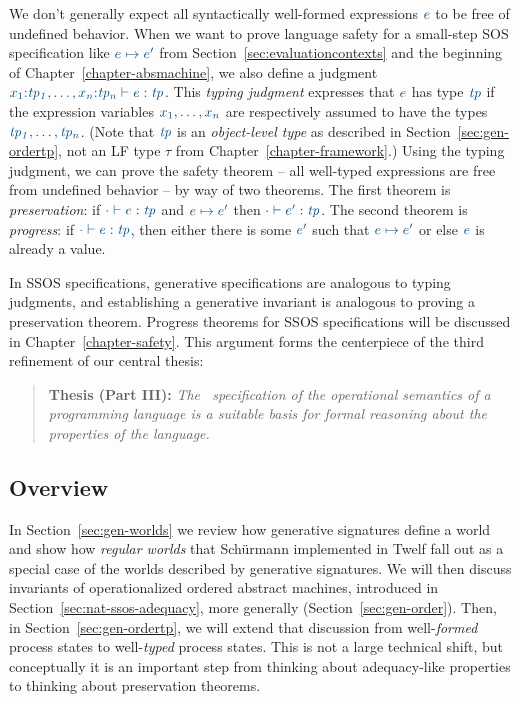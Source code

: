 We don't generally expect all syntactically well-formed expressions
$\obj{e}$ to be free of undefined behavior. When we want to prove
language safety for a small-step SOS specification like $\obj{e
  \mapsto e'}$ from Section~\ref{sec:evaluationcontexts} and the
beginning of Chapter~\ref{chapter-absmachine}, we also define a
judgment $\obj{x_1{:}{\it tp_1},\ldots, x_n{:}{\it tp_n} \vdash e :
  {\it tp}}$.  This {\it typing judgment} expresses that $\obj{e}$ has
type $\obj{\it tp}$ if the expression variables $\obj{x_1, \ldots,
  x_n}$ are respectively assumed to have the types $\obj{\it tp_1,
  \ldots, tp_n}$. (Note that $\obj{\it tp}$ is an {\it object-level
  type} as described in Section~\ref{sec:gen-ordertp}, not an LF type
$\tau$ from Chapter~\ref{chapter-framework}.) Using the typing
judgment, we can prove the safety theorem -- all well-typed
expressions are free from undefined behavior -- by way of two
theorems. The first theorem is {\it preservation}: if $\obj{\cdot
  \vdash e : {\it tp}}$ and $\obj{e \mapsto e'}$ then $\obj{\cdot
  \vdash e' : {\it tp}}$. The second theorem is {\it progress}: if
$\obj{\cdot \vdash e : {\it tp}}$, then either there is some
$\obj{e'}$ such that $\obj{e \mapsto e'}$ or else $\obj{e}$ is already
a value.

In SSOS specifications, generative specifications are analogous to
typing judgments, and establishing a generative invariant is analogous
to proving a preservation theorem. Progress theorems for SSOS
specifications will be discussed in Chapter~\ref{chapter-safety}.
This argument forms the centerpiece of the third refinement of our
central thesis:

\smallskip
\begin{quote} 
  {\bf Thesis (Part III):} {\it The \sls~specification of the operational
    semantics of a programming language is a suitable basis for formal
    reasoning about the properties of the language.}
\end{quote} 


\subsection*{Overview}

In Section~\ref{sec:gen-worlds} we review how generative signatures
define a world and show how {\it regular worlds} that Sch\"urmann
implemented in Twelf \cite{schurmann00automating} fall out as a
special case of the worlds described by generative signatures.  We
will then discuss invariants of operationalized ordered abstract
machines, introduced in Section~\ref{sec:nat-ssos-adequacy}, more
generally (Section~\ref{sec:gen-order}). Then, in
Section~\ref{sec:gen-ordertp}, we will extend that discussion from
well-{\it formed} process states to well-{\it typed} process states.
This is not a large technical shift, but conceptually it is an
important step from thinking about adequacy-like properties to
thinking about preservation theorems. 

